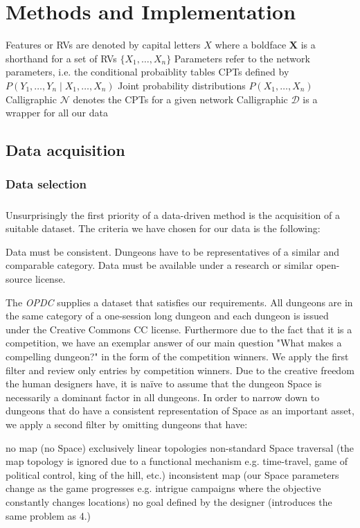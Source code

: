 \documentclass{UoYCSproject}
\begin{document}
\chapter{Methods and Implementation}
Features or RVs are denoted by capital letters \(X\) where a boldface \(\boldsymbol{X}\) is a shorthand for a set of RVs \(\{X_1, \ldots, X_n\}\)
Parameters refer to the network parameters, i.e. the conditional probaiblity tables CPTs defined by \(P(Y_1, \ldots, Y_n \mid X_1, \ldots , X_n)\)
Joint probability distributions \(P(X_1, \ldots , X_n)\)
Calligraphic \(\mathcal{N}\) denotes the CPTs for a given network
Calligraphic \(\mathcal{D}\) is a wrapper for all our data

\section{Data acquisition}
\subsection{Data selection} %
\paragraph{}
Unsurprisingly the first priority of a data-driven method is the acquisition of a suitable dataset. The criteria we have chosen for our data is the following:
\begin{outline}[enumerate]
  \1 Data must be consistent. Dungeons have to be representatives of a similar and comparable category.
  \1 Data must be available under a research or similar open-source license.
\end{outline}
The \textit{OPDC} supplies a dataset that satisfies our requirements. All dungeons are in the same category of a one-session long dungeon and each dungeon is issued under the Creative Commons CC license. Furthermore due to the fact that it is a competition, we have an exemplar answer of our main question "What makes a compelling dungeon?" in the form of the competition winners. We apply the first filter and review only entries by competition winners. Due to the creative freedom the human designers have, it is na\"{i}ve to assume that the dungeon Space is necessarily a dominant factor in all dungeons. In order to narrow down to dungeons that do have a consistent representation of Space as an important asset, we apply a second filter by omitting dungeons that have:
\begin{outline}[enumerate]
  \1 no map (no Space)
  \1 exclusively linear topologies
  \1 non-standard Space traversal (the map topology is ignored due to a functional mechanism e.g. time-travel, game of political control, king of the hill, etc.)
  \1 inconsistent map (our Space parameters change as the game progresses e.g. intrigue campaigns where the objective constantly changes locations)
  \1 no goal defined by the designer (introduces the same problem as 4.)
\end{outline}
\end{document}
